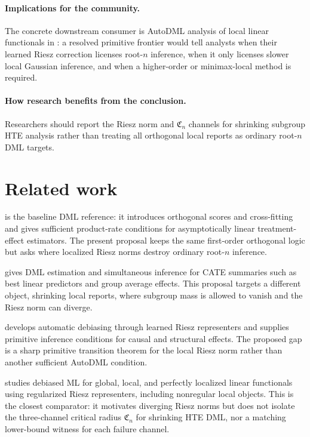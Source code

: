 \documentclass[11pt]{article}
\theoremstyle{definition}
\theoremstyle{plain}
\theoremstyle{remark}
\begin{document}
\paragraph{Implications for the community.}
The concrete downstream consumer is AutoDML analysis of local linear
functionals in \citet{ChernozhukovNeweySingh2022AutoDML}: a resolved
primitive frontier would tell analysts when their learned Riesz correction
licenses root-\(n\) inference, when it only licenses slower local Gaussian
inference, and when a higher-order or minimax-local method is required.

\paragraph{How research benefits from the conclusion.}
Researchers should report the Riesz norm and \(\mathfrak C_n\) channels for
shrinking subgroup HTE analysis rather than treating all orthogonal local
reports as ordinary root-\(n\) DML targets.

\section{Related work}
\citet{ChernozhukovEtAl2018DML} is the baseline DML reference: it introduces
orthogonal scores and cross-fitting and gives sufficient product-rate
conditions for asymptotically linear treatment-effect estimators.  The present
proposal keeps the same first-order orthogonal logic but asks where localized
Riesz norms destroy ordinary root-\(n\) inference.

\citet{SemenovaChernozhukov2021DMLCATE} gives DML estimation and simultaneous
inference for CATE summaries such as best linear predictors and group average
effects.  This proposal targets a different object, shrinking local reports,
where subgroup mass is allowed to vanish and the Riesz norm can diverge.

\citet[Sections~2--3]{ChernozhukovNeweySingh2022AutoDML} develops automatic
debiasing through learned Riesz representers and supplies primitive inference
conditions for causal and structural effects.  The proposed gap is a sharp
primitive transition theorem for the local Riesz norm rather than another
sufficient AutoDML condition.

\citet[Section~2]{ChernozhukovNeweySingh2022Riesz} studies debiased ML for
global, local, and perfectly localized linear functionals using regularized
Riesz representers, including nonregular local objects.  This is the closest
comparator: it motivates diverging Riesz norms but does not isolate the
three-channel critical radius \(\mathfrak C_n\) for shrinking HTE DML, nor a
matching lower-bound witness for each failure channel.
\end{document}

